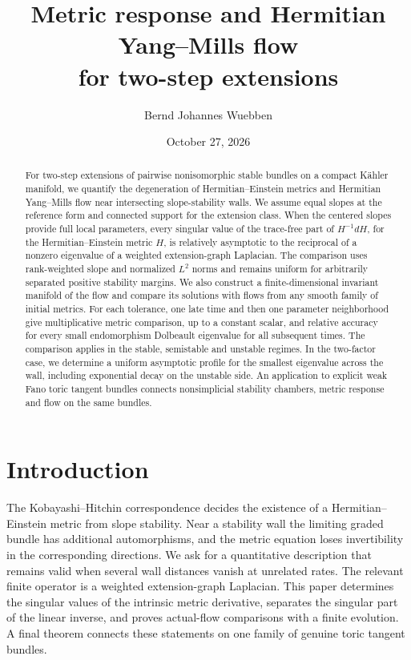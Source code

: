 \documentclass[11pt]{amsart}
\title[Metric response and Hermitian Yang--Mills flow]{Metric response and Hermitian Yang--Mills flow\\for two-step extensions}
\author{Bernd Johannes Wuebben}
\date{October 27, 2026}
\theoremstyle{definition}
\theoremstyle{remark}
\begin{document}
\begin{abstract}
For two-step extensions of pairwise nonisomorphic stable bundles on a
compact Kähler manifold, we quantify the degeneration of
Hermitian--Einstein metrics and Hermitian Yang--Mills flow near
intersecting slope-stability walls. We assume equal slopes at the
reference form and connected support for the extension class.
When the centered slopes provide full local parameters, every singular
value of the trace-free part of \(H^{-1}dH\), for the
Hermitian--Einstein metric \(H\), is relatively asymptotic to the
reciprocal of a nonzero eigenvalue of a weighted extension-graph
Laplacian. The comparison uses rank-weighted slope and normalized
\(L^2\) norms and remains uniform for arbitrarily separated positive
stability margins. We also construct a finite-dimensional invariant
manifold of the flow and compare its solutions with flows from any
smooth family of initial metrics. For each tolerance, one late time
and then one parameter neighborhood give multiplicative metric
comparison, up to a constant scalar, and relative accuracy for every
small endomorphism Dolbeault eigenvalue for all subsequent times.
The comparison applies in the stable, semistable and unstable regimes.
In the two-factor case, we determine a uniform asymptotic profile for
the smallest eigenvalue across the wall, including exponential decay
on the unstable side.
An application to explicit weak Fano toric tangent bundles connects
nonsimplicial stability chambers, metric response and flow on the
same bundles.
\end{abstract}
\maketitle
\enlargethispage{5pt}


\section{Introduction}\label{sec01:intro}

The Kobayashi--Hitchin correspondence decides the existence of a
Hermitian--Einstein metric from slope stability. Near a stability
wall the limiting graded bundle has additional automorphisms, and
the metric equation loses invertibility in the corresponding
directions. We ask for a quantitative description that remains
valid when several wall distances vanish at unrelated rates.
The relevant finite operator is a weighted extension-graph
Laplacian. This paper determines the singular values of the
intrinsic metric derivative, separates the singular part of the
linear inverse, and proves actual-flow comparisons with a finite
evolution. A final theorem connects these statements on one family
of genuine toric tangent bundles.
\end{document}
